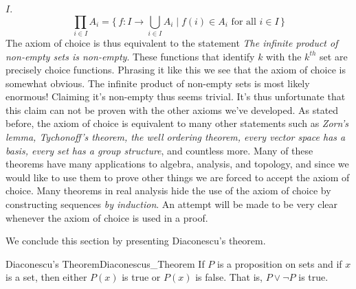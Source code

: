         $I$.
        \begin{equation}
            \prod_{i\in{I}}A_{i}
            =\big\{\,f:I\rightarrow\bigcup_{i\in{I}}A_{i}\;|\;
                f(i)\in{A}_{i}\textrm{ for all }i\in{I}\,\big\}
        \end{equation}
        The axiom of choice is thus equivalent to the statement
        \textit{The infinite product of non-empty sets is non-empty}. These
        functions that identify $k$ with the $k^{th}$ set are precisely
        choice functions. Phrasing it like this we see that the axiom of choice
        is somewhat obvious. The infinite product of non-empty sets is most
        likely enormous! Claiming it's non-empty thus seems trivial. It's thus
        unfortunate that this claim can not be proven with the other axioms
        we've developed. As stated before, the axiom of choice is equivalent to
        many other statements such as \textit{Zorn's lemma, Tychonoff's theorem,
        the well ordering theorem, every vector space has a basis, every set has
        a group structure}, and countless more. Many of these theorems have many
        applications to algebra, analysis, and topology, and since we would like
        to use them to prove other things we are forced to accept the axiom of
        choice. Many theorems in real analysis hide the use of the axiom of
        choice by constructing sequences \textit{by induction}. An attempt will
        be made to be very clear whenever the axiom of choice is used in a
        proof.
        \par\hfill\par
        We conclude this section by presenting Diaconescu's theorem.
        \begin{ftheorem}{Diaconescu's Theorem}{Diaconescus_Theorem}
            If $P$ is a proposition on sets and if $x$ is a set, then either
            $P(x)$ is true or $P(x)$ is false. That is, $P\lor\neg{P}$ is true.
        \end{ftheorem}

